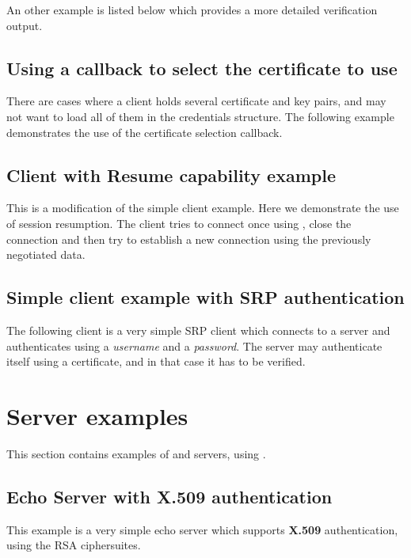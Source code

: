 

An other example is listed below which provides a more detailed verification
output. 



\subsection{Using a callback to select the certificate to use}
There are cases where a client holds several certificate and key pairs,
and may not want to load all of them in the credentials structure.
The following example demonstrates the use of the certificate selection callback.
\par




\subsection{Client with Resume capability example}
\label{resume-example}
This is a modification of the simple client example. Here we demonstrate
the use of session resumption. The client tries to connect once using
\tls{}, close the connection and then try to establish a new connection
using the previously negotiated data.


\subsection{Simple client example with SRP authentication}
The following client
is a very simple SRP \tls{} client which connects to a server 
and authenticates using a {\it username} and a {\it password}. The
server may authenticate itself using a certificate, and in that case it
has to be verified.


\section{Server examples}
This section contains examples of \tls{} and \ssl{} servers, using \gnutls{}.

\subsection{Echo Server with X.509 authentication}
This example is a very simple echo server which supports {\bf X.509} authentication,
using the RSA ciphersuites.


